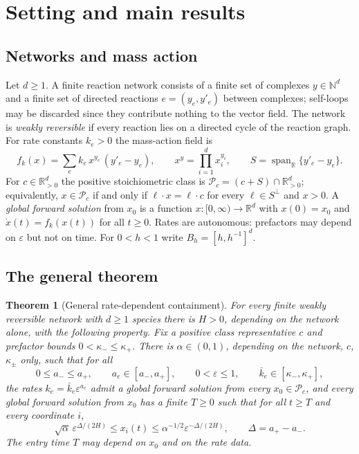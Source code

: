 \documentclass[11pt,a4paper]{article}
\theoremstyle{plain}
\newtheorem{theorem}{Theorem}[section]
\theoremstyle{definition}
\theoremstyle{remark}
\newcommand{\R}{\mathbb R}
\newcommand{\N}{\mathbb N}
\newcommand{\eps}{\varepsilon}
\newcommand{\calP}{\mathcal P}
\DeclareMathOperator{\spn}{span}
\begin{document}
\section{Setting and main results}
\label{sec:statements}

\subsection{Networks and mass action}
Let $d\ge1$. A finite reaction network consists of a finite set of complexes $y\in\N^d$ and a finite set of directed reactions $e=(y_e,y'_e)$ between complexes; self-loops may be discarded since they contribute nothing to the vector field. The network is \emph{weakly reversible} if every reaction lies on a directed cycle of the reaction graph. For rate constants $k_e>0$ the mass-action field is
\begin{equation}\label{eq:massaction}
 f_k(x)=\sum_e k_e\,x^{y_e}\,(y'_e-y_e),\qquad x^y=\prod_{i=1}^d x_i^{y_i},\qquad
 S=\spn_{\R}\{y'_e-y_e\}.
\end{equation}
For $c\in\R^d_{>0}$ the positive stoichiometric class is $\calP_c=(c+S)\cap\R^d_{>0}$; equivalently, $x\in\calP_c$ if and only if $\ell\cdot x=\ell\cdot c$ for every $\ell\in S^\perp$ and $x>0$. A \emph{global forward solution} from $x_0$ is a function $x:[0,\infty)\to\R^d$ with $x(0)=x_0$ and $\dot x(t)=f_k(x(t))$ for all $t\ge0$. Rates are autonomous: prefactors may depend on $\eps$ but not on time. For $0<h<1$ write $B_h=[h,h^{-1}]^d$.

\subsection{The general theorem}

\begin{theorem}[General rate-dependent containment]\label{thm:general}
For every finite weakly reversible network with $d\ge1$ species there is $H>0$, depending on the network alone, with the following property. Fix a positive class representative $c$ and prefactor bounds $0<\kappa_-\le\kappa_+$. There is $\alpha\in(0,1)$, depending on the network, $c$, $\kappa_\pm$ only, such that for all
\[
0\le a_-\le a_+,\qquad a_e\in[a_-,a_+],\qquad 0<\eps\le1,\qquad \bar k_e\in[\kappa_-,\kappa_+],
\]
the rates $k_e=\bar k_e\eps^{a_e}$ admit a global forward solution from every $x_0\in\calP_c$, and every global forward solution from $x_0$ has a finite $T\ge0$ such that for all $t\ge T$ and every coordinate $i$,
\begin{equation}\label{eq:general-bound}
 \sqrt\alpha\,\eps^{\Delta/(2H)}\le x_i(t)\le\alpha^{-1/2}\eps^{-\Delta/(2H)},\qquad \Delta=a_+-a_-.
\end{equation}
The entry time $T$ may depend on $x_0$ and on the rate data.
\end{theorem}
\end{document}
